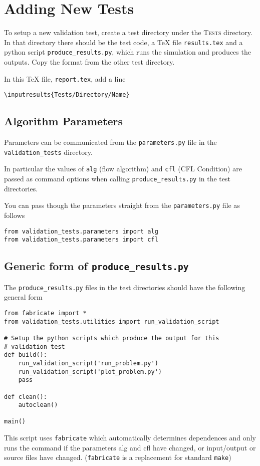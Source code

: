 \documentclass[11pt,a4paper]{report}
\begin{document}
\chapter{Adding New Tests}


To setup a new validation test, create a test directory under the
\textsc{Tests} directory. In that directory there should be the test code, a
\TeX{} file \texttt{results.tex} and a python script
\texttt{produce\_results.py}, which runs the simulation and produces the
outputs. Copy the format from the other test directory. 

In this \TeX{} file, \texttt{report.tex}, add a line
\begin{verbatim}
\inputresults{Tests/Directory/Name}
\end{verbatim}



\section{Algorithm Parameters}
Parameters can be communicated from the \verb|parameters.py|
file in the \verb|validation_tests| directory.

In particular the
values of \verb|alg| (flow algorithm) and \verb|cfl| (CFL Condition)
are passed as command options when calling \verb|produce_results.py| in the
test directories.

You can pass though the parameters straight from the \verb|parameters.py| file as follows
\begin{verbatim}
from validation_tests.parameters import alg
from validation_tests.parameters import cfl
\end{verbatim}

\section{Generic form of \texttt{produce\_results.py}}

The \texttt{produce\_results.py} files in the test directories should have the
following general form

\begin{verbatim}
from fabricate import *
from validation_tests.utilities import run_validation_script

# Setup the python scripts which produce the output for this
# validation test
def build():
    run_validation_script('run_problem.py')
    run_validation_script('plot_problem.py')
    pass

def clean():
    autoclean()

main()
\end{verbatim}
This script uses \texttt{fabricate} which automatically determines dependences
and only runs the command if the parameters alg and cfl have changed,
or input/output or source files have changed. (\texttt{fabricate} is a replacement for
standard \texttt{make})
\end{document}
